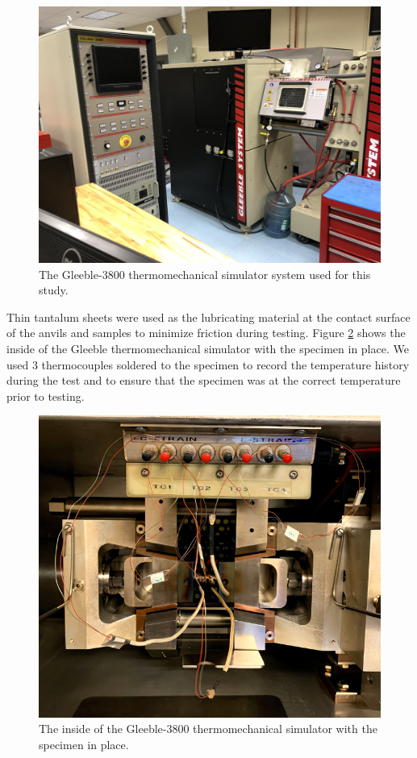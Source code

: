 \documentclass[metals,article,accept,pdftex,moreauthors]{Definitions/mdpi}
\begin{document}
\vspace{2pt}
\begin{figure}[H]

\includegraphics[width=0.7\columnwidth]{Figures/Gleeble-3800}
\caption{The Gleeble-3800 thermomechanical simulator system used for this study.}
\label{fig:Gleeble3800}
\end{figure}
Thin tantalum sheets were used as the lubricating material at the contact surface of the anvils and samples to minimize friction during testing.
Figure \ref{fig:Inside-Gleeble3800} shows the inside of the Gleeble thermomechanical simulator with the specimen in place. We used 3 thermocouples soldered to the specimen to record the temperature history during the test and to ensure that the specimen was at the correct temperature prior to testing.
\begin{figure}[H]

\includegraphics[width=0.7\columnwidth]{Figures/Gleeble-1}
\caption{The inside of the Gleeble-3800 thermomechanical simulator with the specimen in place.}
\label{fig:Inside-Gleeble3800}
\end{figure}
\end{document}
